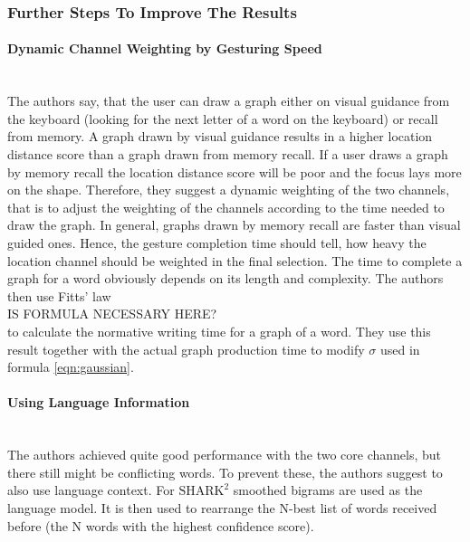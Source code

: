 \subsubsection{Further Steps To Improve The Results}
\paragraph{Dynamic Channel Weighting by Gesturing Speed}\
\label{gesturing speed}\\
The authors say, that the user can draw a graph either on visual guidance from the keyboard (looking for the next letter of a word on the keyboard) or recall from memory. A graph drawn by visual guidance results in a higher location distance score than a graph drawn from memory recall. If a user draws a graph by memory recall the location distance score will be poor and the focus lays more on the shape. Therefore, they suggest a dynamic weighting of the two channels, that is to adjust the weighting of the channels according to the time needed to draw the graph. In general, graphs drawn by memory recall are faster than visual guided ones. Hence, the gesture completion time should tell, how heavy the location channel should be weighted in the final selection. The time to complete a graph for a word obviously depends on its length and complexity. The authors then use Fitts' law\\
IS FORMULA NECESSARY HERE?\\
to calculate the normative writing time for a graph of a word. They use this result together with the actual graph production time to modify $\sigma$ used in formula \ref{eqn:gaussian}.\\
\paragraph{Using Language Information}\ \\
The authors achieved quite good performance with the two core channels, but there still might be conflicting words. To prevent these, the authors suggest to also use language context. For $\text{SHARK}^2$ smoothed bigrams are used as the language model. It is then used to rearrange the N-best list of words received before (the N words with the highest confidence score).